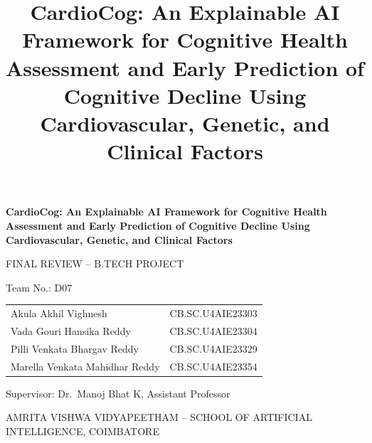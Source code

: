 \documentclass[aspectratio=169,11pt]{beamer}
\title{CardioCog: An Explainable AI Framework for Cognitive Health Assessment and Early Prediction of Cognitive Decline Using Cardiovascular, Genetic, and Clinical Factors}
\begin{document}
{
\begin{frame}[noframenumbering]
\centering
\vspace{0.6em}
{\color{maroon}\bfseries\large CardioCog: An Explainable AI Framework for Cognitive Health Assessment and Early Prediction of Cognitive Decline Using Cardiovascular, Genetic, and Clinical Factors\par}
\vspace{1.0em}
FINAL REVIEW -- B.TECH PROJECT\par
\vspace{0.8em}
Team No.: D07\par
\vspace{0.5em}
\small
\begin{tabular}{ll}
Akula Akhil Vighnesh & CB.SC.U4AIE23303 \\
Vada Gouri Hansika Reddy & CB.SC.U4AIE23304 \\
Pilli Venkata Bhargav Reddy & CB.SC.U4AIE23329 \\
Marella Venkata Mahidhar Reddy & CB.SC.U4AIE23354 \\
\end{tabular}\par
\vspace{0.8em}
\normalsize Supervisor: Dr.\ Manoj Bhat K, Assistant Professor\par
\vspace{0.8em}
AMRITA VISHWA VIDYAPEETHAM -- SCHOOL OF ARTIFICIAL INTELLIGENCE, COIMBATORE
\end{frame}}
\end{document}
